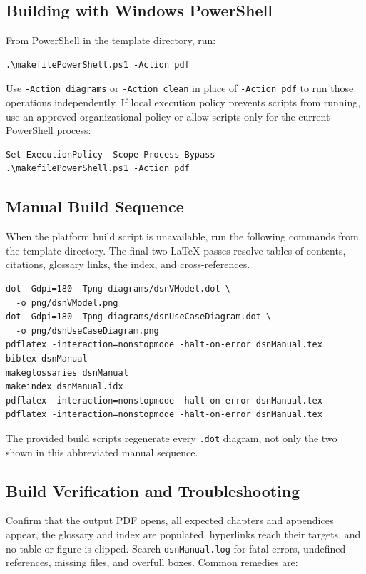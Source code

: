 \subsection{Building with Windows PowerShell}

From PowerShell in the template directory, run:

\begin{verbatim}
.\makefilePowerShell.ps1 -Action pdf
\end{verbatim}

Use \texttt{-Action diagrams} or \texttt{-Action clean} in place of \texttt{-Action pdf} to run those operations independently. If local execution policy prevents scripts from running, use an approved organizational policy or allow scripts only for the current PowerShell process:

\begin{verbatim}
Set-ExecutionPolicy -Scope Process Bypass
.\makefilePowerShell.ps1 -Action pdf
\end{verbatim}

\subsection{Manual Build Sequence}

When the platform build script is unavailable, run the following commands from
the template directory. The final two LaTeX passes resolve tables of contents,
citations, glossary links, the index, and cross-references.

\begin{verbatim}
dot -Gdpi=180 -Tpng diagrams/dsnVModel.dot \
  -o png/dsnVModel.png
dot -Gdpi=180 -Tpng diagrams/dsnUseCaseDiagram.dot \
  -o png/dsnUseCaseDiagram.png
pdflatex -interaction=nonstopmode -halt-on-error dsnManual.tex
bibtex dsnManual
makeglossaries dsnManual
makeindex dsnManual.idx
pdflatex -interaction=nonstopmode -halt-on-error dsnManual.tex
pdflatex -interaction=nonstopmode -halt-on-error dsnManual.tex
\end{verbatim}

The provided build scripts regenerate every \texttt{.dot} diagram, not only the
two shown in this abbreviated manual sequence.

\subsection{Build Verification and Troubleshooting}

Confirm that the output PDF opens, all expected chapters and appendices appear,
the glossary and index are populated, hyperlinks reach their targets, and no
table or figure is clipped. Search \texttt{dsnManual.log} for fatal errors,
undefined references, missing files, and overfull boxes. Common remedies are:


